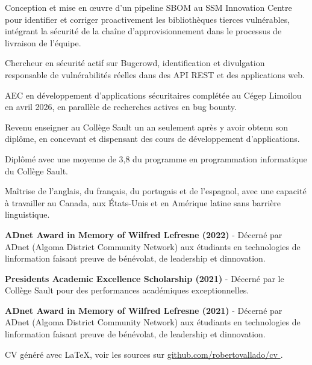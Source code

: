 \documentclass[]{resume-format}
\begin{document}
\vspace{0.5mm}
\begin{cvachievements}
\setlength{\itemsep}{0mm}
  \item { Conception et mise en œuvre d'un pipeline SBOM au SSM Innovation Centre pour identifier et corriger proactivement les bibliothèques tierces vulnérables, intégrant la sécurité de la chaîne d'approvisionnement dans le processus de livraison de l'équipe. }
  \item { Chercheur en sécurité actif sur Bugcrowd, identification et divulgation responsable de vulnérabilités réelles dans des API REST et des applications web. \href{ https://bugcrowd.com }{\scriptsize\color{lightgray}\faLink} }
  \item { AEC en développement d'applications sécuritaires complétée au Cégep Limoilou en avril 2026, en parallèle de recherches actives en bug bounty. }
  \item { Revenu enseigner au Collège Sault un an seulement après y avoir obtenu son diplôme, en concevant et dispensant des cours de développement d'applications. }
  \item { Diplômé avec une moyenne de 3,8 du programme en programmation informatique du Collège Sault. }
  \item { Maîtrise de l'anglais, du français, du portugais et de l'espagnol, avec une capacité à travailler au Canada, aux États-Unis et en Amérique latine sans barrière linguistique. }
\end{cvachievements}



\vspace{0.5mm}
\begin{cvachievements}
\setlength{\itemsep}{0mm}
  \item { \textbf{ ADnet Award in Memory of Wilfred Lefresne (2022) } - Décerné par ADnet (Algoma District Community Network) aux étudiants en technologies de l\textquotesingle{}information faisant preuve de bénévolat, de leadership et d\textquotesingle{}innovation. }
  \item { \textbf{ President\textquotesingle{}s Academic Excellence Scholarship (2021) } - Décerné par le Collège Sault pour des performances académiques exceptionnelles. }
  \item { \textbf{ ADnet Award in Memory of Wilfred Lefresne (2021) } - Décerné par ADnet (Algoma District Community Network) aux étudiants en technologies de l\textquotesingle{}information faisant preuve de bénévolat, de leadership et d\textquotesingle{}innovation. }
\end{cvachievements}



\vspace{5mm}
\begin{center}
    \tiny\color{lightgray}
    CV généré avec LaTeX, voir les sources sur
    \href{https://github.com/robertovallado/cv}{ github.com/robertovallado/cv }.
\end{center}
\ 
\end{document}
